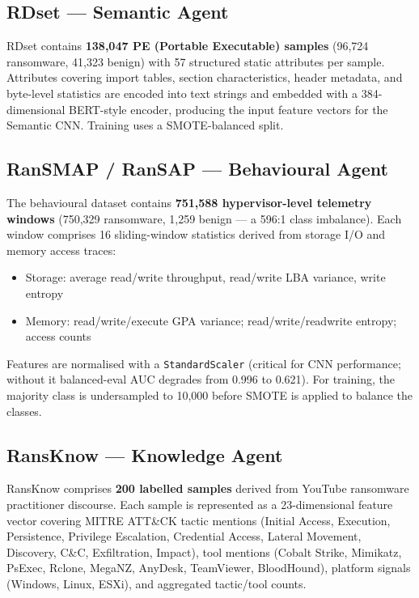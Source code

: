 \documentclass[12pt,a4paper]{article}
\begin{document}
\subsection{RDset — Semantic Agent}

RDset contains \textbf{138,047 PE (Portable Executable) samples} (96,724 ransomware,
41,323 benign) with 57 structured static attributes per sample. Attributes covering
import tables, section characteristics, header metadata, and byte-level statistics are
encoded into text strings and embedded with a 384-dimensional BERT-style encoder,
producing the input feature vectors for the Semantic CNN. Training uses a
SMOTE-balanced split.

\subsection{RanSMAP / RanSAP — Behavioural Agent}

The behavioural dataset contains \textbf{751,588 hypervisor-level telemetry windows}
(750,329 ransomware, 1,259 benign — a 596:1 class imbalance). Each window comprises
16 sliding-window statistics derived from storage I/O and memory access traces:

\begin{itemize}[leftmargin=2em]
  \item Storage: average read/write throughput, read/write LBA variance, write entropy
  \item Memory: read/write/execute GPA variance; read/write/readwrite entropy; access counts
\end{itemize}

Features are normalised with a \texttt{StandardScaler} (critical for CNN performance;
without it balanced-eval AUC degrades from 0.996 to 0.621). For training, the majority
class is undersampled to 10,000 before SMOTE is applied to balance the classes.

\subsection{RansKnow — Knowledge Agent}

RansKnow comprises \textbf{200 labelled samples} derived from YouTube ransomware
practitioner discourse. Each sample is represented as a 23-dimensional feature vector
covering MITRE ATT\&CK tactic mentions (Initial Access, Execution, Persistence,
Privilege Escalation, Credential Access, Lateral Movement, Discovery, C\&C,
Exfiltration, Impact), tool mentions (Cobalt Strike, Mimikatz, PsExec, Rclone,
MegaNZ, AnyDesk, TeamViewer, BloodHound), platform signals (Windows, Linux, ESXi),
and aggregated tactic/tool counts.
\end{document}
